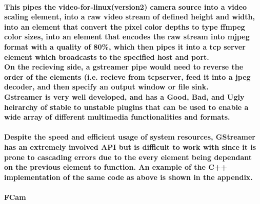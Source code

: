 \documentclass[11pt]{article} %
\begin{document}
\paragraph{This pipes the video-for-linux(version2) camera source into a video scaling element, into a raw video stream of defined height and width, into an element that convert the pixel color depths to type ffmpeg color sizes, into an element that encodes the raw stream into mjpeg format with a quality of 80\%, which then pipes it into a tcp server element which broadcasts to the specified host and port.
\\On the recieving side, a gstreamer pipe would need to reverse the order of the elements (i.e. recieve from tcpserver, feed it into a jpeg decoder, and then specify an output window or file sink.
\\Gstreamer is very well developed, and has a Good, Bad, and Ugly heirarchy of stable to unstable plugins that can be used to enable a wide array of different multimedia functionalities and formats.
}
\paragraph{Despite the speed and efficient usage of system resources, GStreamer has an extremely involved API but is difficult to work with since it is prone to cascading errors due to the every element being dependant on the previous element to function. An example of the C++ implementation of the same code as above is shown in the appendix.}


\paragraph{\bf{FCam}}
\end{document}
